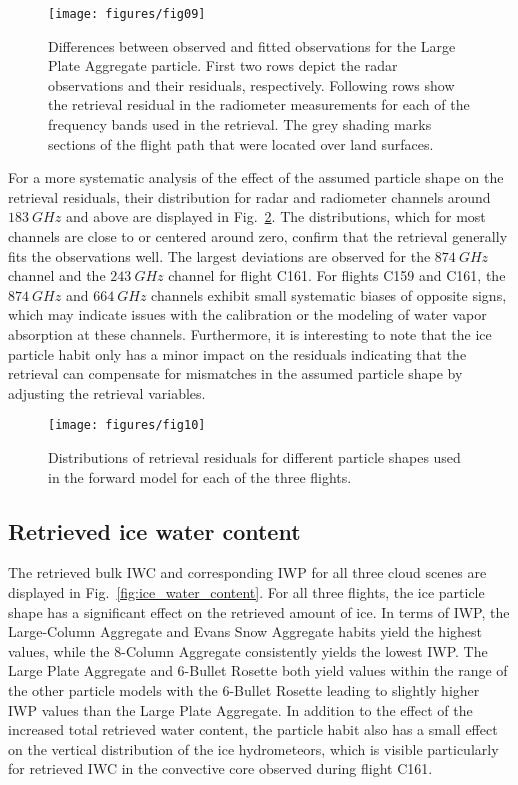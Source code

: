 \documentclass[journal abbreviation, manuscript]{copernicus}
\begin{document}
\begin{figure}[!hbpt]
  \centering
  \texttt{[image: figures/fig09]}
  \caption{Differences between observed and fitted observations for the Large
    Plate Aggregate particle. First two rows depict the radar observations and
    their residuals, respectively. Following rows show the retrieval residual in
    the radiometer measurements for each of the frequency bands used in the
    retrieval. The grey shading marks sections of the flight path that were
    located over land surfaces. }
  \label{fig:residuals}
\end{figure}

For a more systematic analysis of the effect of the assumed particle shape on
the retrieval residuals, their distribution for radar and radiometer channels
around $183\ \unit{GHz}$ and above are displayed in
Fig.~\ref{fig:residuals_box}. The distributions, which for most channels are
close to or centered around zero, confirm that the retrieval generally fits the
observations well. The largest deviations are observed for the $874\ \unit{GHz}$
channel and the $243\ \unit{GHz}$ channel for flight C161. For flights C159 and
C161, the $874\ \unit{GHz}$ and $664\ \unit{GHz}$ channels exhibit small
systematic biases of opposite signs, which may indicate issues with the
calibration or the modeling of water vapor absorption at these channels.
Furthermore, it is interesting to note that the ice particle habit only has a
minor impact on the residuals indicating that the retrieval can compensate for
mismatches in the assumed particle shape by adjusting the retrieval variables.


\begin{figure}[!hbpt]
  \centering
  \texttt{[image: figures/fig10]}
  \caption{Distributions of retrieval residuals for different particle
    shapes used in the forward model for each of the three flights.}
  \label{fig:residuals_box}
\end{figure}

\subsection{Retrieved ice water content}

The retrieved bulk IWC and corresponding IWP for all three cloud scenes are
displayed in Fig.~\ref{fig:ice_water_content}. For all three flights, the ice
particle shape has a significant effect on the retrieved amount of ice. In terms
of IWP, the Large-Column Aggregate and Evans Snow Aggregate habits yield the
highest values, while the 8-Column Aggregate consistently yields the lowest IWP.
The Large Plate Aggregate and 6-Bullet Rosette both yield values within the
range of the other particle models with the 6-Bullet Rosette leading to slightly
higher IWP values than the Large Plate Aggregate. In addition to the effect of
the increased total retrieved water content, the particle habit also has a small
effect on the vertical distribution of the ice hydrometeors, which is visible
particularly for retrieved IWC in the convective core observed during flight
C161.
\end{document}
